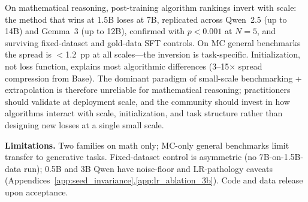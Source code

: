 \documentclass{article}
\begin{document}
On mathematical reasoning, post-training algorithm rankings invert with scale: the method that wins at 1.5B loses at 7B, replicated across Qwen~2.5 (up to 14B) and Gemma~3 (up to 12B), confirmed with $p<0.001$ at $N{=}5$, and surviving fixed-dataset and gold-data SFT controls. On MC general benchmarks the spread is $<$1.2~pp at all scales---the inversion is task-specific. Initialization, not loss function, explains most algorithmic differences (3--15$\times$ spread compression from Base). The dominant paradigm of small-scale benchmarking + extrapolation is therefore unreliable for mathematical reasoning; practitioners should validate at deployment scale, and the community should invest in how algorithms interact with scale, initialization, and task structure rather than designing new losses at a single small scale.

\textbf{Limitations.}
Two families on math only; MC-only general benchmarks limit transfer to generative tasks. Fixed-dataset control is asymmetric (no 7B-on-1.5B-data run); 0.5B and 3B Qwen have noise-floor and LR-pathology caveats (Appendices~\ref{app:seed_invariance},\ref{app:lr_ablation_3b}). Code and data release upon acceptance.
\end{document}
